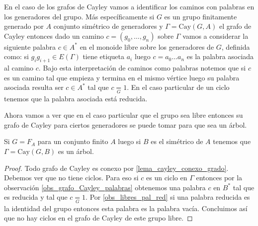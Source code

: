 \documentclass[tesis.tex]{subfiles}
\begin{document}
\begin{obs}\label{obs_grafo_Cayley_palabras}
	
En el caso de los grafos de Cayley vamos a identificar los caminos con palabras en los generadores del grupo.
Más específicamente si $G$ es un grupo finitamente generado por $A$ conjunto simétrico de generadores y $\Gamma = \text{Cay}(G,A)$ el grafo de Cayley entonces dado un camino $c = (g_{0}, \dots, g_{n})$ sobre $\Gamma$ vamos a considerar la siguiente palabra $c \in A^{*}$ en el monoide libre sobre los generadores de $G$, definida como:
si $g_{i}g_{i+1} \in E(\Gamma)$ tiene etiqueta $a_{i}$ luego $c = a_{0}\dots a_{n}$ es la palabra asociada al camino $c$.
Bajo esta interpretación de caminos como palabras notemos que si $c$ es un camino tal que empieza y termina en el mismo vértice luego su palabra asociada resulta ser $c \in A^*$ tal que $c \underset{G}{=} 1$.
En el caso particular de un ciclo tenemos que la palabra asociada está reducida.
\end{obs}

Ahora vamos a ver que en el caso particular que el grupo sea libre entonces su grafo de Cayley para ciertos generadores se puede tomar para que sea un árbol.

\begin{lema}\label{lema_cayley_libre_arbol}
	Si $G = F_{A}$ para un conjunto finito $A$ luego si $B$ es el simétrico de $A$ tenemos que $\Gamma = \text{Cay}(G,B)$ es un árbol.
\end{lema}

\begin{proof}
	Todo grafo de Cayley es conexo por \ref{lema_cayley_conexo_grado}.
	Debemos ver que no tiene ciclos.
	Para eso si $c$ es un ciclo en $\Gamma$ entonces por la observación \ref{obs_grafo_Cayley_palabras} obtenemos una palabra $c$ en $B^*$ tal que es {reducida} y tal que $c \underset{G}{=} 1$.
	Por \ref{obs_libres_pal_red} si una palabra reducida es la identidad del grupo entonces esta palabra es la palabra vacía.
	Concluimos así que no hay ciclos en el grafo de Cayley de este grupo libre.
	
\end{proof}
\end{document}
